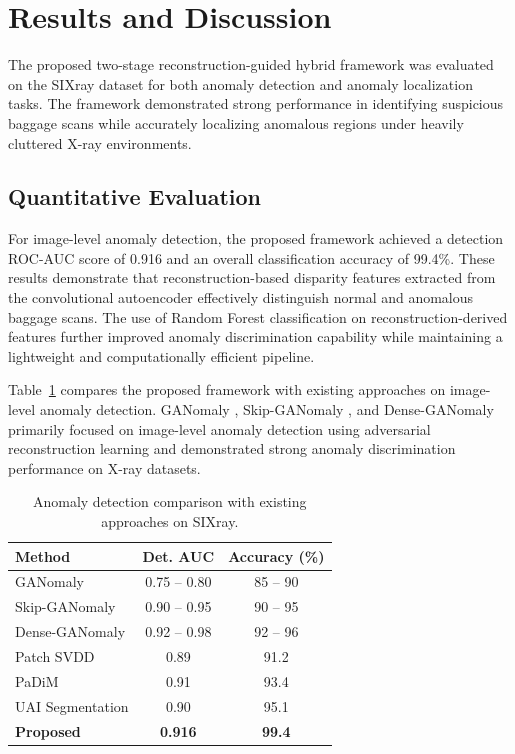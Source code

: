 \documentclass{bmvc2k}
\begin{document}
\section{Results and Discussion}

The proposed two-stage reconstruction-guided hybrid framework was evaluated on the SIXray dataset for both anomaly detection and anomaly localization tasks. The framework demonstrated strong performance in identifying suspicious baggage scans while accurately localizing anomalous regions under heavily cluttered X-ray environments.

\subsection{Quantitative Evaluation}

For image-level anomaly detection, the proposed framework achieved a detection ROC-AUC score of 0.916 and an overall classification accuracy of 99.4\%. These results demonstrate that reconstruction-based disparity features extracted from the convolutional autoencoder effectively distinguish normal and anomalous baggage scans. The use of Random Forest classification on reconstruction-derived features further improved anomaly discrimination capability while maintaining a lightweight and computationally efficient pipeline.

Table~\ref{tab:detection_results} compares the proposed framework with existing approaches on image-level anomaly detection. GANomaly \cite{akcay2018ganomaly}, Skip-GANomaly \cite{akcay2019skip}, and Dense-GANomaly \cite{denseganomaly2020} primarily focused on image-level anomaly detection using adversarial reconstruction learning and demonstrated strong anomaly discrimination performance on X-ray datasets.

\begin{table}[ht]
    \begin{center}
        \begin{tabular}{|l|c|c|}
            \hline
            Method & Det. AUC & Accuracy (\%) \\
            \hline\hline
            GANomaly \cite{akcay2018ganomaly} & 0.75 -- 0.80 & 85 -- 90 \\
            Skip-GANomaly \cite{akcay2019skip} & 0.90 -- 0.95 & 90 -- 95 \\
            Dense-GANomaly \cite{denseganomaly2020} & 0.92 -- 0.98 & 92 -- 96 \\
            Patch SVDD \cite{yi2020patchsvdd} & 0.89 & 91.2 \\
            PaDiM \cite{defard2020padim} & 0.91 & 93.4 \\
            UAI Segmentation \cite{hassan2021unsupervised} & 0.90 & 95.1 \\
            \textbf{Proposed} & \textbf{0.916} & \textbf{99.4} \\
            \hline
        \end{tabular}
    \end{center}
    \caption{Anomaly detection comparison with existing approaches on SIXray.}
    \label{tab:detection_results}
\end{table}
\end{document}
